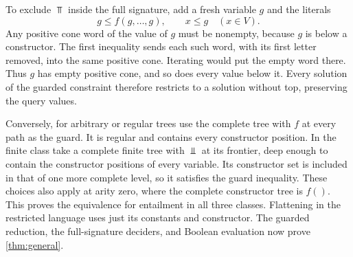To exclude $\Top$ inside the full signature, add a fresh
variable $g$ and the literals
\[
         g\le f(g,\dots,g),\qquad x\le g\quad(x\in V).
\]
Any positive cone word of the value of $g$ must be nonempty,
because $g$ is below a constructor. The first inequality sends
each such word, with its first letter removed, into the same
positive cone. Iterating would put the empty word there.
Thus $g$ has empty positive cone, and so does every value below
it. Every solution of the guarded constraint therefore restricts
to a solution without top, preserving the query values.

Conversely, for arbitrary or regular trees use the complete
tree with $f$ at every path as the guard. It is regular and
contains every constructor position. In the finite class take
a complete finite tree with $\Bot$ at its frontier, deep enough
to contain the constructor positions of every variable. Its
constructor set is included in that of one more complete level,
so it satisfies the guard inequality. These choices also apply
at arity zero, where the complete constructor tree is $f()$.
This proves the equivalence for entailment in all three classes.
Flattening in the restricted language uses just its constants
and constructor. The guarded reduction, the full-signature
deciders, and Boolean evaluation now prove \cref{thm:general}.

